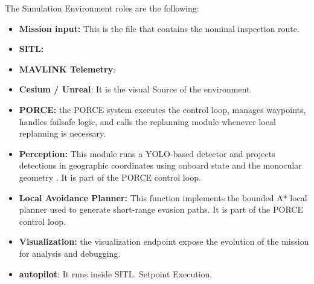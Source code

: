 \documentclass[journal,twoside,web]{ieeecolor}
\begin{document}
The Simulation Environment roles are the following:
\begin{itemize}
    \item \textbf{Mission input:} This is the file that contains the nominal inspection route.
    \item \textbf{SITL:}
    \item \textbf{MAVLINK Telemetry}:
    \item \textbf{Cesium / Unreal}: It is the visual Source of the environment. 
    \item \textbf{PORCE:} the PORCE system executes the control loop, manages waypoints, handles failsafe logic, and calls the replanning module whenever local replanning is necessary.
    \item \textbf{Perception:} This module runs a YOLO-based detector and projects detections in geographic coordinates using onboard state and the monocular geometry \cite{alaez2023real}. It is part of the PORCE control loop. 
    \item \textbf{Local Avoidance Planner:} This function implements the bounded A* local planner used to generate short-range evasion paths. It is part of the PORCE control loop. 
    \item \textbf{Visualization:} the visualization endpoint expose the evolution of the mission for analysis and debugging.
    \item \textbf{autopilot}: It runs inside SITL. Setpoint Execution. 
\end{itemize}
\end{document}
